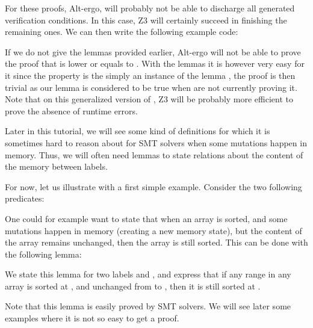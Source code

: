 


For these proofs, Alt-ergo, will probably not be able to discharge all
generated verification conditions. In this case, Z3 will certainly succeed
in finishing the remaining ones. We can then write the following example code:






If we do not give the lemmas provided earlier, Alt-ergo will not be able
to prove the proof that  is lower or equals to
. With the lemmas it is however very easy for it since the
property is the simply an instance of the lemma
, the proof is then trivial as our lemma is
considered to be true when are not currently proving it. Note that on this
generalized version of , Z3 will be probably more efficient
to prove the absence of runtime errors.




Later in this tutorial, we will see some kind of definitions for which it is
sometimes hard to reason about for SMT solvers when some mutations happen in
memory. Thus, we will often need lemmas to state relations about the content
of the memory between labels.


For now, let us illustrate with a first simple example. Consider the two following
predicates:




One could for example want to state that when an array is sorted, and some
mutations happen in memory (creating a new memory state), but the content of the
array remains unchanged, then the array is still sorted. This can be done with
the following lemma:




We state this lemma for two labels  and , and
express that if any range in any array is sorted at , and
unchanged from  to , then it is still sorted at
.


Note that this lemma is easily proved by SMT solvers. We will see later some
examples where it is not so easy to get a proof.



